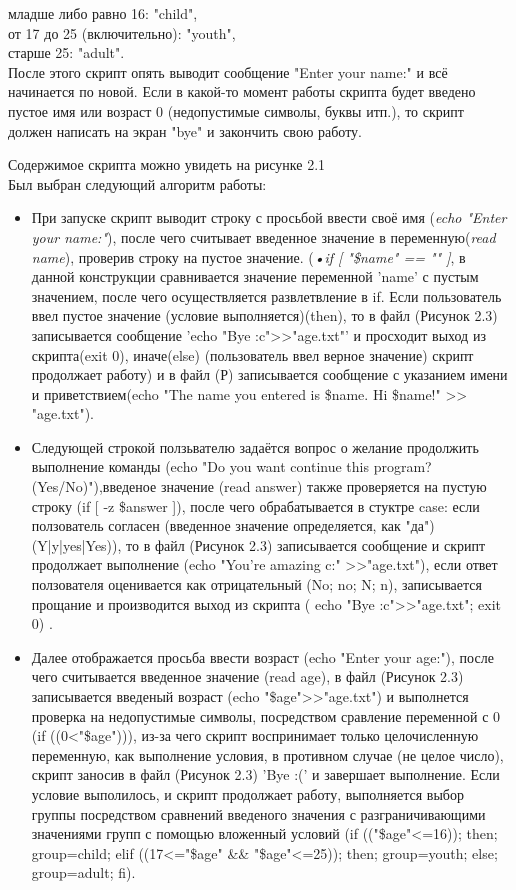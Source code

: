 младше либо равно 16: "child", \\

от 17 до 25 (включительно): "youth", \\

старше 25: "adult". \\

После этого скрипт опять выводит сообщение "Enter your name:" и всё начинается по новой. Если в какой-то момент работы скрипта будет введено пустое имя или возраст 0 (недопустимые символы, буквы итп.), то скрипт должен написать на экран "bye" и закончить свою работу. 
	
	\vspace{1cm}	
Содержимое скрипта можно увидеть на рисунке 2.1\\	
Был выбран следующий алгоритм работы: 
	\begin{itemize}
	\item 
	При запуске скрипт выводит строку с просьбой ввести своё имя (\textit{echo "Enter your name:"}), после чего считывает введенное значение в переменную(\textit{read name}), проверив строку на пустое значение. (\textit{•if [ "\$name" == "" ]}, в данной конструкции сравнивается значение переменной 'name' с пустым значением, после чего осуществляется развлетвление в if. Если пользователь ввел пустое значение (условие выполняется)(then), то в файл (Рисунок 2.3) записывается сообщение 'echo "Bye :c">>"age.txt"' и просходит выход из скрипта(exit 0), иначе(else) (пользователь ввел верное значение) скрипт продолжает работу) и в файл (Р) записывается сообщение с указанием имени и приветствием(echo "The name you entered is \$name. Hi \$name!" >> "age.txt"). 
	\item
	Следующей строкой ползьвателю задаётся вопрос о желание продолжить выполнение команды (echo "Do you want continue this program? (Yes/No)"),введеное значение (read answer) также проверяется на пустую строку (if [ -z \$answer ]), после чего обрабатывается в стуктре case: если ползователь согласен (введенное значение определяется, как "да")(Y|y|yes|Yes)), то в файл (Рисунок 2.3) записывается сообщение и скрипт продолжает выполнение (echo "You're amazing c:" >>"age.txt"), если ответ ползователя оценивается как отрицательный (No; no; N; n), записывается прощание и производится выход из скрипта ( echo "Bye :c">>"age.txt"; exit 0) .  
	\item
	Далее отображается просьба ввести возраст (echo "Enter your age:"), после чего считывается введенное значение (read age), в файл (Рисунок 2.3) записывается введеный возраст (echo "\$age">>"age.txt") и выполнется проверка на недопустимые символы, посредством сравление переменной с 0 (if ((0<"\$age"))), из-за чего скрипт воспринимает только целочисленную переменную, как выполнение условия, в противном случае (не целое число), скрипт заносив в файл (Рисунок 2.3) 'Bye :(' и завершает выполнение. Если условие выполилось, и скрипт продолжает работу, выполняется выбор группы посредством сравнений введеного значения с разграничивающими значениями групп с помощью вложенный условий (if (("\$age"<=16)); then;            group=child; elif ((17<="\$age" \&\& "\$age"<=25)); then;       group=youth; else; group=adult; fi).

\end{itemize}
